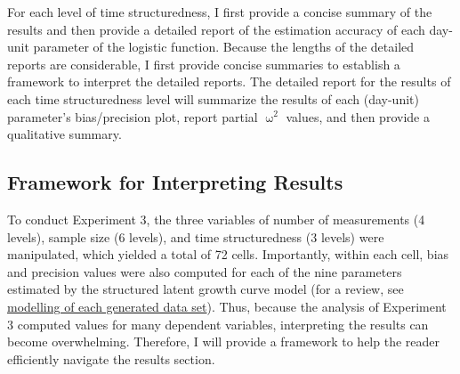 \documentclass[
12pt, %
twoside,
english]{guelphthesis}
\begin{document}
For each level of time structuredness, I first provide a concise summary of the results and then provide a detailed report of the estimation accuracy of each day-unit parameter of the logistic function. Because the lengths of the detailed reports are considerable, I first provide concise summaries to establish a framework to interpret the detailed reports. The detailed report for the results of each time structuredness level will summarize the results of each (day-unit) parameter's bias/precision plot, report partial \(\upomega^2\) values, and then provide a qualitative summary.

\hypertarget{framework-for-interpreting-results-2}{%
\subsection{Framework for Interpreting Results}\label{framework-for-interpreting-results-2}}

To conduct Experiment 3, the three variables of number of measurements (4 levels), sample size (6 levels), and time structuredness (3 levels) were manipulated, which yielded a total of 72 cells. Importantly, within each cell, bias and precision values were also computed for each of the nine parameters estimated by the structured latent growth curve model (for a review, see \protect\hyperlink{modelling-data-sets}{modelling of each generated data set}). Thus, because the analysis of Experiment 3 computed values for many dependent variables, interpreting the results can become overwhelming. Therefore, I will provide a framework to help the reader efficiently navigate the results section.
\end{document}
